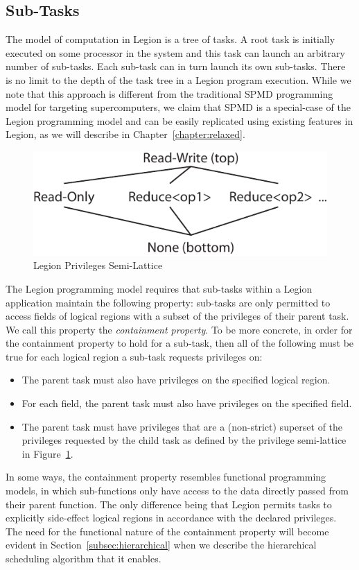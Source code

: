 \subsection{Sub-Tasks}
\label{subsec:subtasks}
The model of computation in Legion is a tree of
tasks. A root task is initially executed on some
processor in the system and this task can launch
an arbitrary number of sub-tasks. Each sub-task
can in turn launch its own sub-tasks.  There
is no limit to the depth of the task tree in a
Legion program execution. While we note that this approach
is different from the traditional SPMD programming
model for targeting supercomputers, we claim that
SPMD is a special-case of the Legion programming
model and can be easily replicated using existing
features in Legion, as we will describe in 
Chapter~\ref{chapter:relaxed}.

\begin{figure}[t]
\centering
\includegraphics[scale=0.7]{figs/PrivilegeLattice}
\caption{Legion Privileges Semi-Lattice\label{fig:privlattice}}
\end{figure}

The Legion programming model requires that sub-tasks
within a Legion application maintain the following
property: sub-tasks are only permitted to
access fields of logical regions with a subset of the
privileges of their parent task.
We call this property the {\em containment property}.
To be more concrete, in order for the containment 
property to hold for a sub-task, then all of the
following must be true for each logical region
a sub-task requests privileges on:
\begin{itemize}
\item The parent task must also have privileges
      on the specified logical region.
\item For each field, the parent task must also
      have privileges on the specified field.
\item The parent task must have privileges that
      are a (non-strict) superset of the privileges
      requested by the child task as defined by
      the privilege semi-lattice in 
      Figure~\ref{fig:privlattice}.
\end{itemize}
In some ways, the containment property resembles functional
programming models, in which sub-functions only have
access to the data directly passed from their parent
function. The only difference being that Legion 
permits tasks to explicitly side-effect logical regions
in accordance with the declared privileges. The need for
the functional nature of the containment property will
become evident in Section~\ref{subsec:hierarchical} when
we describe the hierarchical scheduling algorithm that
it enables.

